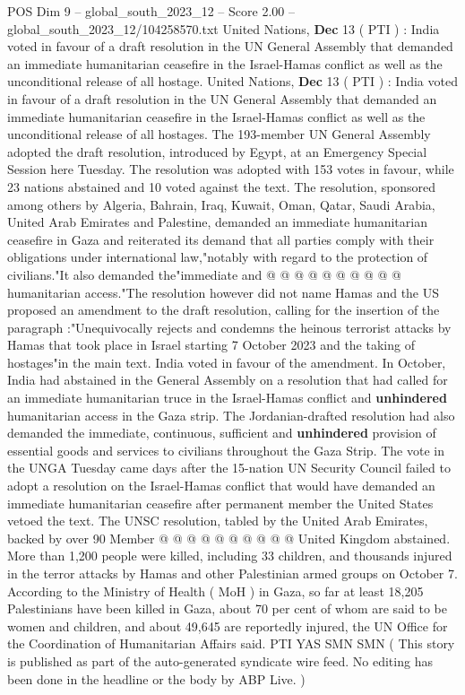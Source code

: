 \begin{textsample}{POS Dim 9 – global\_south\_2023\_12 – Score 2.00 – global\_south\_2023\_12/104258570.txt}  \label{ex:f9_pos_019}
United Nations, \textbf{Dec} 13 ( PTI ) : India voted in favour of a draft resolution in the UN General Assembly that demanded an immediate humanitarian ceasefire in the Israel-Hamas conflict as well as the unconditional release of all hostage.
United Nations, \textbf{Dec} 13 ( PTI ) : India voted in favour of a draft resolution in the UN General Assembly that demanded an immediate humanitarian ceasefire in the Israel-Hamas conflict as well as the unconditional release of all hostages.
The 193-member UN General Assembly adopted the draft resolution, introduced by Egypt, at an Emergency Special Session here Tuesday.
The resolution was adopted with 153 votes in favour, while 23 nations abstained and 10 voted against the text.
The resolution, sponsored among others by Algeria, Bahrain, Iraq, Kuwait, Oman, Qatar, Saudi Arabia, United Arab Emirates and Palestine, demanded an immediate humanitarian ceasefire in Gaza and reiterated its demand that all parties comply with their obligations under international law,"notably with regard to the protection of civilians."It also demanded the"immediate and @ @ @ @ @ @ @ @ @ @ humanitarian access."The resolution however did not name Hamas and the US proposed an amendment to the draft resolution, calling for the insertion of the paragraph :"Unequivocally rejects and condemns the heinous terrorist attacks by Hamas that took place in Israel starting 7 October 2023 and the taking of hostages"in the main text.
India voted in favour of the amendment.
In October, India had abstained in the General Assembly on a resolution that had called for an immediate humanitarian truce in the Israel-Hamas conflict and \textbf{unhindered} humanitarian access in the Gaza strip.
The Jordanian-drafted resolution had also demanded the immediate, continuous, sufficient and \textbf{unhindered} provision of essential goods and services to civilians throughout the Gaza Strip.
The vote in the UNGA Tuesday came days after the 15-nation UN Security Council failed to adopt a resolution on the Israel-Hamas conflict that would have demanded an immediate humanitarian ceasefire after permanent member the United States vetoed the text.
The UNSC resolution, tabled by the United Arab Emirates, backed by over 90 Member @ @ @ @ @ @ @ @ @ @ United Kingdom abstained.
More than 1,200 people were killed, including 33 children, and thousands injured in the terror attacks by Hamas and other Palestinian armed groups on October 7.
According to the Ministry of Health ( MoH ) in Gaza, so far at least 18,205 Palestinians have been killed in Gaza, about 70 per cent of whom are said to be women and children, and about 49,645 are reportedly injured, the UN Office for the Coordination of Humanitarian Affairs said.
PTI YAS SMN SMN ( This story is published as part of the auto-generated syndicate wire feed.
No editing has been done in the headline or the body by ABP Live. )

\end{textsample}
